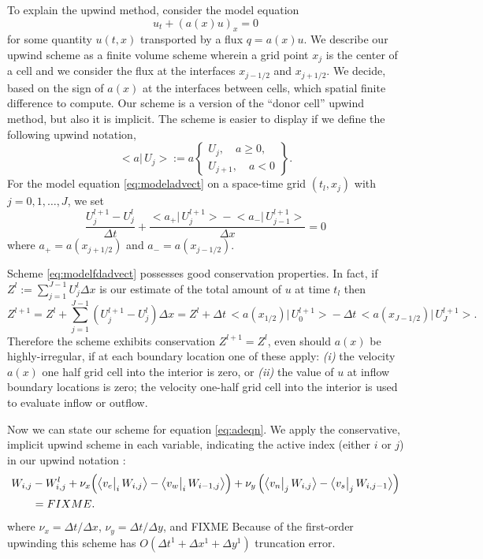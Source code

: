 \documentclass[12pt,final]{amsart}%
\begin{document}
To explain the upwind method, consider the model equation
\begin{equation} \label{eq:modeladvect}
u_t + (a(x) u)_x = 0
\end{equation}
for some quantity $u(t,x)$ transported by a flux $q = a(x) u$.  We describe our upwind scheme as a finite volume scheme \citep{LeVeque} wherein a grid point $x_j$ is the center of a cell and we consider the flux at the interfaces $x_{j-1/2}$ and $x_{j+1/2}$.  We decide, based on the sign of $a(x)$ at the interfaces between cells, which spatial finite difference to compute.  Our scheme is a version of the ``donor cell'' upwind method, but also it is implicit.  The scheme is easier to display if we define the following upwind notation,
\newcommand{\up}[2]{\big<#1\big|\,#2\big>}
	$$\up{a}{U_j} := a \begin{Bmatrix} U_j, \quad a \ge 0, \\ U_{j+1}, \quad a< 0 \end{Bmatrix}.$$
For the model equation \eqref{eq:modeladvect} on a space-time grid $(t_l,x_j)$ with $j=0,1,\dots,J$, we set
\begin{equation}\label{eq:modelfdadvect}
\frac{U_j^{l+1} - U_j^l}{\Delta t} + \frac{\up{a_+}{U_j^{l+1}} - \up{a_-}{U_{j-1}^{l+1}}}{\Delta x} = 0
\end{equation}
where $a_+ = a(x_{j+1/2})$ and $a_-=a(x_{j-1/2})$.

Scheme \eqref{eq:modelfdadvect} possesses good conservation properties.  In fact, if $Z^l := \sum_{j=1}^{J-1} U_j^l \Delta x$ is our estimate of the total amount of $u$ at time $t_l$ then
    $$Z^{l+1} = Z^l + \sum_{j=1}^{J-1} (U_j^{l+1} - U_j^l) \Delta x = Z^l + \Delta t \, \up{a(x_{1/2})}{U_0^{l+1}} - \Delta t\, \up{a(x_{J-1/2})}{U_J^{l+1}}.$$
Therefore the scheme exhibits conservation $Z^{l+1}=Z^l$, even should $a(x)$ be highly-irregular, if at each boundary location one of these apply:  \emph{(i)} the velocity $a(x)$ one half grid cell into the interior is zero, or \emph{(ii)} the value of $u$ at inflow boundary locations is zero; the velocity one-half grid cell into the interior is used to evaluate inflow or outflow.

Now we can state our scheme for equation \eqref{eq:adeqn}.  We apply the conservative, implicit upwind scheme in each variable, indicating the active index (either $i$ or $j$) in our upwind notation :
\begin{align}
 \Wij &- \Wlij + \nu_x \Big(\upp{v_e}{\Wij}{i} - \upp{v_w}{W_{i-1,j}}{i}\Big) + \nu_y \left(\upp{v_n}{\Wij}{j} - \upp{v_s}{W_{i,j-1}}{j}\right)\label{eq:Wfd} \\
      &= FIXME. \notag
\end{align}
where $\nu_x = \Delta t/\Delta x$, $\nu_y = \Delta t/\Delta y$, and FIXME
Because of the first-order upwinding this scheme has $O(\Delta t^1 + \Delta x^1 + \Delta y^1)$ truncation error.




\small

\end{document}
